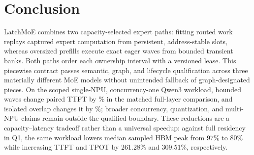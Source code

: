 \section{Conclusion}
\label{sec:conclusion}

LatchMoE combines two capacity-selected expert paths: fitting routed work
replays captured expert computation from persistent, address-stable slots,
whereas oversized prefills execute exact eager waves from bounded transient
banks. Both paths order each ownership interval with a versioned lease. This
piecewise contract passes semantic, graph, and lifecycle qualification across
three materially different MoE models without unintended fallback of
graph-designated pieces. On the scoped single-NPU, concurrency-one Qwen3
workload, bounded waves
change paired TTFT by \BoundedTTFTEffect\% in the matched full-layer
comparison, and isolated overlap changes it by \OverlapTTFTEffect\%; broader
concurrency, quantization, and multi-NPU claims remain outside the qualified
boundary. These reductions are a
capacity--latency tradeoff rather than a universal speedup: against full
residency in Q1, the same workload lowers median sampled HBM peak from 97\%
to 80\% while
increasing TTFT and TPOT by 261.28\% and 309.51\%, respectively.
